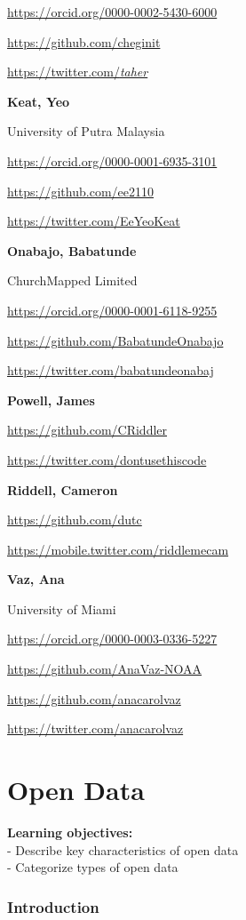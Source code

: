 \documentclass[
  letterpaper,
  DIV=11,
  numbers=noendperiod]{scrreport}
\begin{document}
\url{https://orcid.org/0000-0002-5430-6000}

\url{https://github.com/cheginit}

\href{https://twitter.com/_taher_}{https://twitter.com/\emph{taher}}

\textbf{Keat, Yeo}

University of Putra Malaysia

\url{https://orcid.org/0000-0001-6935-3101}

\url{https://github.com/ee2110}

\url{https://twitter.com/EeYeoKeat}

\textbf{Onabajo, Babatunde}

ChurchMapped Limited

\url{https://orcid.org/0000-0001-6118-9255}

\url{https://github.com/BabatundeOnabajo}

\url{https://twitter.com/babatundeonabaj}

\textbf{Powell, James}

\url{https://github.com/CRiddler}

\url{https://twitter.com/dontusethiscode}

\textbf{Riddell, Cameron}

\url{https://github.com/dutc}

\url{https://mobile.twitter.com/riddlemecam}

\textbf{Vaz, Ana}

University of Miami

\url{https://orcid.org/0000-0003-0336-5227}

\url{https://github.com/AnaVaz-NOAA}

\url{https://github.com/anacarolvaz}

\url{https://twitter.com/anacarolvaz}

\part{Open Data}

\textbf{Learning objectives:}\\
- Describe key characteristics of open data\\
- Categorize types of open data

\hypertarget{introduction-10}{%
\section*{Introduction}\label{introduction-10}}
\end{document}
